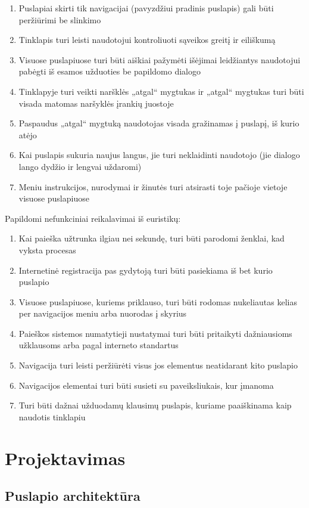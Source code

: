 \documentclass{VUMIFPSkursinis}
\begin{document}
\begin{enumerate}
	\item Puslapiai skirti tik navigacijai (pavyzdžiui pradinis puslapis) gali būti peržiūrimi be slinkimo
	\item Tinklapis turi leisti naudotojui kontroliuoti sąveikos greitį ir eiliškumą
	\item Visuose puslapiuose turi būti aiškiai pažymėti išėjimai leidžiantys naudotojui pabėgti iš esamos užduoties be papildomo dialogo
	\item Tinklapyje turi veikti naršklės „atgal“ mygtukas ir „atgal“ mygtukas turi būti visada matomas naršyklės įrankių juostoje
	\item Paspaudus „atgal“ mygtuką naudotojas visada gražinamas į puslapį, iš kurio atėjo
	\item Kai puslapis sukuria naujus langus, jie turi neklaidinti naudotojo (jie dialogo lango dydžio ir lengvai uždaromi)
	\item Meniu instrukcijos, nurodymai ir žinutės turi atsirasti toje pačioje vietoje visuose puslapiuose
\end{enumerate}

Papildomi nefunkciniai reikalavimai iš euristikų:
\begin{enumerate}
	\item Kai paieška užtrunka ilgiau nei sekundę, turi būti parodomi ženklai, kad vyksta procesas
	\item Internetinė registracija pas gydytoją turi būti pasiekiama iš bet kurio puslapio
	\item Visuose puslapiuose, kuriems priklauso, turi būti rodomas nukeliautas kelias per navigacijos meniu arba nuorodas į skyrius
	\item Paieškos sistemos numatytieji nustatymai turi būti pritaikyti dažniausioms užklausoms arba pagal interneto standartus
	\item Navigacija turi leisti peržiūrėti visus jos elementus neatidarant kito puslapio
	\item Navigacijos elementai turi būti susieti su paveiksliukais, kur įmanoma
	\item Turi būti dažnai užduodamų klausimų puslapis, kuriame paaiškinama kaip naudotis tinklapiu
\end{enumerate}

\section{Projektavimas}
\subsection{Puslapio architektūra}
\end{document}
